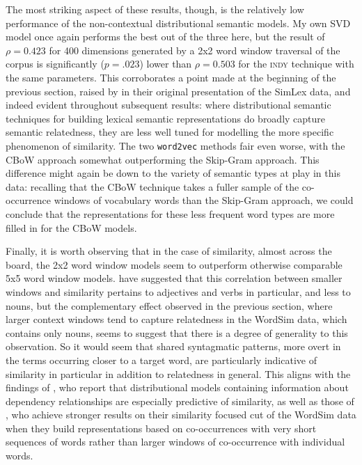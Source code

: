 The most striking aspect of these results, though, is the relatively low performance of the non-contextual distributional semantic models.  My own SVD model once again performs the best out of the three here, but the result of $\rho = 0.423$ for 400 dimensions generated by a 2x2 word window traversal of the corpus is significantly ($p = .023$) lower than $\rho = 0.503$ for the \textsc{indy} technique with the same parameters.  This corroborates a point made at the beginning of the previous section, raised by \cite{HillEA2015} in their original presentation of the SimLex data, and indeed evident throughout subsequent results: where distributional semantic techniques for building lexical semantic representations do broadly capture semantic relatedness, they are less well tuned for modelling the more specific phenomenon of similarity.  The two \texttt{word2vec} methods fair even worse, with the CBoW approach somewhat outperforming the Skip-Gram approach.  This difference might again be down to the variety of semantic types at play in this data: recalling that the CBoW technique takes a fuller sample of the co-occurrence windows of vocabulary words than the Skip-Gram approach, we could conclude that the representations for these less frequent word types are more filled in for the CBoW models.

Finally, it is worth observing that in the case of similarity, almost across the board, the 2x2 word window models seem to outperform otherwise comparable 5x5 word window models.  \cite{HillEA2015} have suggested that this correlation between smaller windows and similarity pertains to adjectives and verbs in particular, and less to nouns, but the complementary effect observed in the previous section, where larger context windows tend to capture relatedness in the WordSim data, which contains only nouns, seems to suggest that there is a degree of generality to this observation.  So it would seem that shared syntagmatic patterns, more overt in the terms occurring closer to a target word, are particularly indicative of similarity in particular in addition to relatedness in general.  This aligns with the findings of \cite{KielaEA2014}, who report that distributional models containing information about dependency relationships are especially predictive of similarity, as well as those of \cite{AgirreEA2009}, who achieve stronger results on their similarity focused cut of the WordSim data when they build representations based on co-occurrences with very short sequences of words rather than larger windows of co-occurrence with individual words.

